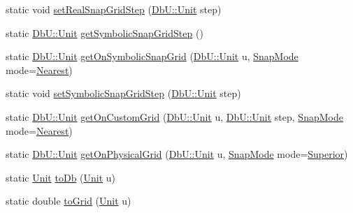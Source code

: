 \begin{DoxyCompactItemize}
\item 
static void \hyperlink{group__DbUGroup_ga202cc3aa3364c2224647a29dde047fae}{set\-Real\-Snap\-Grid\-Step} (\hyperlink{group__DbUGroup_ga4fbfa3e8c89347af76c9628ea06c4146}{Db\-U\-::\-Unit} step)
\item 
static \hyperlink{group__DbUGroup_ga4fbfa3e8c89347af76c9628ea06c4146}{Db\-U\-::\-Unit} \hyperlink{group__DbUGroup_ga687a9134729b107c42fb7f69596c4c3b}{get\-Symbolic\-Snap\-Grid\-Step} ()
\item 
static \hyperlink{group__DbUGroup_ga4fbfa3e8c89347af76c9628ea06c4146}{Db\-U\-::\-Unit} \hyperlink{group__DbUGroup_gad1b0c0f3680093cf5a63d901312c925d}{get\-On\-Symbolic\-Snap\-Grid} (\hyperlink{group__DbUGroup_ga4fbfa3e8c89347af76c9628ea06c4146}{Db\-U\-::\-Unit} u, \hyperlink{group__DbUGroup_ga1082168d6f9956ebba22ab8bbec21637}{Snap\-Mode} mode=\hyperlink{group__DbUGroup_gga1082168d6f9956ebba22ab8bbec21637a65e6f47eb16779b8974a80d6145a2db5}{Nearest})
\item 
static void \hyperlink{group__DbUGroup_ga9ccd423c8f268ef54770f4663e6c9304}{set\-Symbolic\-Snap\-Grid\-Step} (\hyperlink{group__DbUGroup_ga4fbfa3e8c89347af76c9628ea06c4146}{Db\-U\-::\-Unit} step)
\item 
static \hyperlink{group__DbUGroup_ga4fbfa3e8c89347af76c9628ea06c4146}{Db\-U\-::\-Unit} \hyperlink{group__DbUGroup_ga87323d9038656dceabffc37d45de408a}{get\-On\-Custom\-Grid} (\hyperlink{group__DbUGroup_ga4fbfa3e8c89347af76c9628ea06c4146}{Db\-U\-::\-Unit} u, \hyperlink{group__DbUGroup_ga4fbfa3e8c89347af76c9628ea06c4146}{Db\-U\-::\-Unit} step, \hyperlink{group__DbUGroup_ga1082168d6f9956ebba22ab8bbec21637}{Snap\-Mode} mode=\hyperlink{group__DbUGroup_gga1082168d6f9956ebba22ab8bbec21637a65e6f47eb16779b8974a80d6145a2db5}{Nearest})
\item 
static \hyperlink{group__DbUGroup_ga4fbfa3e8c89347af76c9628ea06c4146}{Db\-U\-::\-Unit} \hyperlink{group__DbUGroup_ga9419025221579f4277475c65655be3dc}{get\-On\-Physical\-Grid} (\hyperlink{group__DbUGroup_ga4fbfa3e8c89347af76c9628ea06c4146}{Db\-U\-::\-Unit} u, \hyperlink{group__DbUGroup_ga1082168d6f9956ebba22ab8bbec21637}{Snap\-Mode} mode=\hyperlink{group__DbUGroup_gga1082168d6f9956ebba22ab8bbec21637a8ce92cf7ff7627c46baf85612f9ad847}{Superior})
\item 
static \hyperlink{group__DbUGroup_ga4fbfa3e8c89347af76c9628ea06c4146}{Unit} \hyperlink{group__DbUGroup_gaec07c6e7ae2a2a6f54e2a16b32c8bf26}{to\-Db} (\hyperlink{group__DbUGroup_ga4fbfa3e8c89347af76c9628ea06c4146}{Unit} u)
\item 
static double \hyperlink{group__DbUGroup_ga318d673386c9424e07c12efd598c730d}{to\-Grid} (\hyperlink{group__DbUGroup_ga4fbfa3e8c89347af76c9628ea06c4146}{Unit} u)

\end{DoxyCompactItemize}
